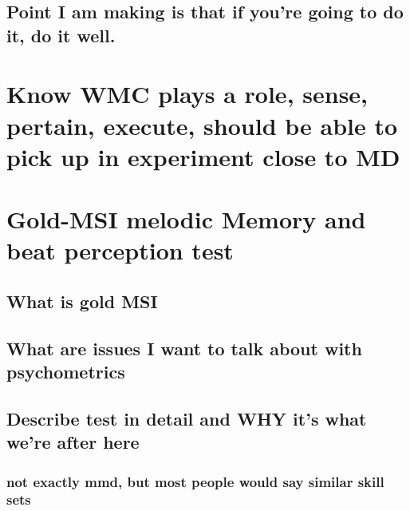\documentclass[]{book}
\theoremstyle{definition}
\theoremstyle{definition}
\theoremstyle{definition}
\theoremstyle{remark}
\begin{document}
\hypertarget{point-i-am-making-is-that-if-youre-going-to-do-it-do-it-well.}{%
\subsection{Point I am making is that if you're going to do it, do it
well.}\label{point-i-am-making-is-that-if-youre-going-to-do-it-do-it-well.}}

\hypertarget{know-wmc-plays-a-role-sense-pertain-execute-should-be-able-to-pick-up-in-experiment-close-to-md}{%
\section{Know WMC plays a role, sense, pertain, execute, should be able
to pick up in experiment close to
MD}\label{know-wmc-plays-a-role-sense-pertain-execute-should-be-able-to-pick-up-in-experiment-close-to-md}}

\hypertarget{gold-msi-melodic-memory-and-beat-perception-test}{%
\section{Gold-MSI melodic Memory and beat perception
test}\label{gold-msi-melodic-memory-and-beat-perception-test}}

\hypertarget{what-is-gold-msi}{%
\subsection{What is gold MSI}\label{what-is-gold-msi}}

\hypertarget{what-are-issues-i-want-to-talk-about-with-psychometrics}{%
\subsection{What are issues I want to talk about with
psychometrics}\label{what-are-issues-i-want-to-talk-about-with-psychometrics}}

\hypertarget{describe-test-in-detail-and-why-its-what-were-after-here}{%
\subsection{Describe test in detail and WHY it's what we're after
here}\label{describe-test-in-detail-and-why-its-what-were-after-here}}

\hypertarget{not-exactly-mmd-but-most-people-would-say-similar-skill-sets}{%
\subsubsection{not exactly mmd, but most people would say similar skill
sets}\label{not-exactly-mmd-but-most-people-would-say-similar-skill-sets}}
\end{document}
